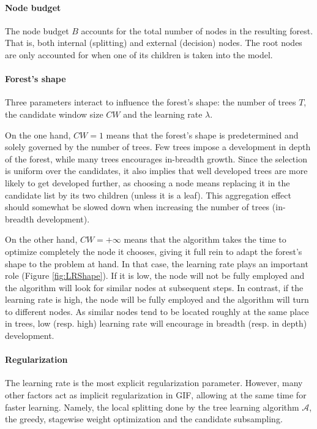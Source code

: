 \documentclass{article}
\begin{document}
\paragraph{Node budget}
The node budget $B$ accounts for the total number of nodes in the resulting 
forest. That is, both internal (splitting) and external (decision) nodes. The 
root nodes are only accounted for when one of its children is taken into the 
model.

\paragraph{Forest's shape}
Three parameters interact to influence the forest's shape: the number of trees 
$T$, the candidate window size $CW$ and the learning rate $\lambda$. 

On the one hand, $CW=1$ means that the forest's shape is predetermined and 
solely governed by the number of trees. Few trees impose a development in 
depth of the forest, while many trees encourages in-breadth growth. Since the 
selection is uniform over the candidates, it also implies that well developed 
trees are more likely to get developed further, as choosing a node means 
replacing it in the candidate list by its two children (unless it is a leaf). 
This aggregation effect should somewhat be slowed down when increasing the 
number of trees (in-breadth development).

On the other hand, $CW=+\infty$ means that the algorithm takes the 
time to optimize completely the node it chooses, giving it full rein to adapt 
the forest's shape to the problem at hand. In that case, the learning rate 
plays an important role (Figure \ref{fig:LRShape}). If it is low, the node will 
not be fully employed and the algorithm will look for similar nodes at 
subsequent steps.
In contrast, if the learning rate is high, the node will be fully employed
and the algorithm will turn to different nodes.
As similar nodes tend to be located roughly at the same place in trees, low 
(resp. high) learning rate will encourage in breadth (resp. in depth) 
development.

\paragraph{Regularization}
The learning rate is the most explicit regularization parameter. However, many 
other factors act as implicit regularization in GIF, allowing at the same time 
for faster learning. 
Namely, the local splitting done by the tree learning algorithm $\mathcal{A}$, 
the greedy, stagewise weight optimization and the candidate subsampling.
\end{document}
